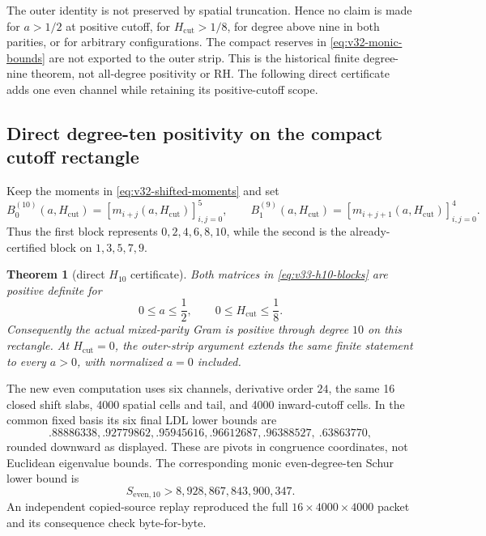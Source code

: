 \documentclass[11pt]{article}
\newtheorem{theorem}{Theorem}[section]
\theoremstyle{definition}
\theoremstyle{remark}
\begin{document}
The outer identity is not preserved by spatial truncation. Hence no claim is
made for $a>1/2$ at positive cutoff, for $H_{\mathrm{cut}}>1/8$, for degree
above nine in both parities, or for arbitrary configurations. The compact
reserves in \eqref{eq:v32-monic-bounds} are not exported to the outer strip.
This is the historical finite degree-nine theorem, not all-degree positivity or
RH.  The following direct certificate adds one even channel while retaining its
positive-cutoff scope.

\subsection{Direct degree-ten positivity on the compact cutoff rectangle}

Keep the moments in \eqref{eq:v32-shifted-moments} and set
\begin{equation}
 B_0^{(10)}(a,H_{\mathrm{cut}})
   =[m_{i+j}(a,H_{\mathrm{cut}})]_{i,j=0}^{5},
 \qquad
 B_1^{(9)}(a,H_{\mathrm{cut}})
   =[m_{i+j+1}(a,H_{\mathrm{cut}})]_{i,j=0}^{4}.
 \label{eq:v33-h10-blocks}
\end{equation}
Thus the first block represents $0,2,4,6,8,10$, while the second is the
already-certified block on $1,3,5,7,9$.

\begin{theorem}[direct $H_{10}$ certificate]
Both matrices in \eqref{eq:v33-h10-blocks} are positive definite for
\begin{equation}
 0\le a\le\frac12,
 \qquad 0\le H_{\mathrm{cut}}\le\frac18.
 \label{eq:v33-h10-rectangle}
\end{equation}
Consequently the actual mixed-parity Gram is positive through degree $10$ on
this rectangle.  At $H_{\mathrm{cut}}=0$, the outer-strip argument extends the
same finite statement to every $a>0$, with normalized $a=0$ included.
\end{theorem}

The new even computation uses six channels, derivative order $24$, the same 16
closed shift slabs, 4000 spatial cells and tail, and 4000 inward-cutoff cells.
In the common fixed basis its six final LDL lower bounds are
\[
 .88886338, .92779862, .95945616, .96612687, .96388527,
 \ .63863770,
\]
rounded downward as displayed.  These are pivots in congruence coordinates,
not Euclidean eigenvalue bounds.  The corresponding monic even-degree-ten
Schur lower bound is
\begin{equation}
 S_{\mathrm{even},10}>8{,}928{,}867{,}843{,}900{,}347.
 \label{eq:v33-even10-monic}
\end{equation}
An independent copied-source replay reproduced the full
$16\times4000\times4000$ packet and its consequence check byte-for-byte.
\end{document}
